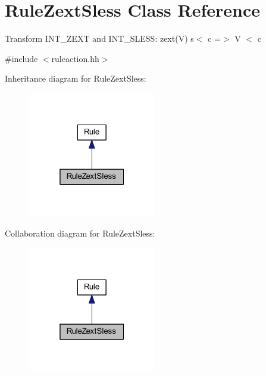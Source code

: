 \hypertarget{class_rule_zext_sless}{}\section{Rule\+Zext\+Sless Class Reference}
\label{class_rule_zext_sless}


Transform I\+N\+T\+\_\+\+Z\+E\+XT and I\+N\+T\+\_\+\+S\+L\+E\+SS\+: {\ttfamily zext(\+V) s$<$ c =$>$ V $<$ c}  




{\ttfamily \#include $<$ruleaction.\+hh$>$}



Inheritance diagram for Rule\+Zext\+Sless\+:
\nopagebreak
\begin{figure}[H]
\begin{center}
\leavevmode
\includegraphics[width=160pt]{class_rule_zext_sless__inherit__graph}
\end{center}
\end{figure}


Collaboration diagram for Rule\+Zext\+Sless\+:
\nopagebreak
\begin{figure}[H]
\begin{center}
\leavevmode
\includegraphics[width=160pt]{class_rule_zext_sless__coll__graph}
\end{center}
\end{figure}
